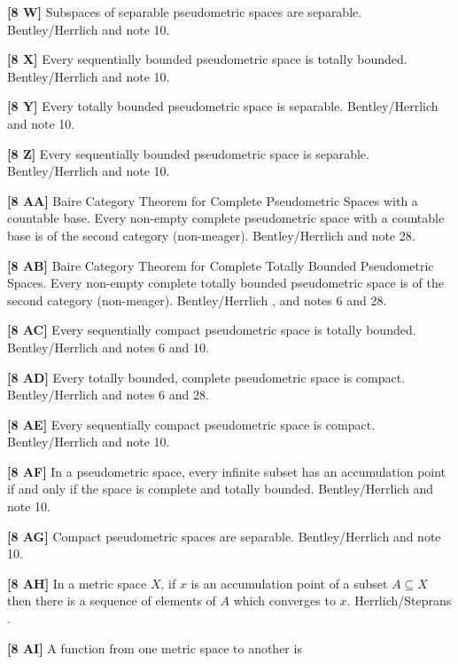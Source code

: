 \smallskip
\item{}{\bf [8 W]} Subspaces of separable pseudometric spaces are separable.
\ac{Bentley/Herrlich} \cite{1998} and note 10.
\smallskip
\item{}{\bf [8 X]} Every sequentially bounded pseudometric space is
totally bounded. \ac{Bentley/Herrlich} \cite{1998} and note 10.
\smallskip
\item{}{\bf [8 Y]} Every totally bounded pseudometric space is
separable.  \ac{Bentley/Herrlich} \cite{1998} and note 10.
\smallskip
\item{}{\bf [8 Z]} Every sequentially bounded pseudometric space is
separable.  \ac{Bentley/Herrlich} \cite{1998} and note 10.
\smallskip
\item{}{\bf [8 AA]} Baire Category Theorem for Complete Pseudometric
Spaces with a countable base.  Every non-empty complete pseudometric
space with a countable base is of the second category (non-meager).
\ac{Bentley/Herrlich} \cite{1998} and note 28.
\smallskip
\item{}{\bf [8 AB]} Baire Category Theorem for Complete Totally
Bounded Pseudometric Spaces.  Every non-empty complete totally bounded
pseudometric space is of the second category (non-meager).
\ac{Bentley/Herrlich} \cite{1998}, and notes 6 and 28.
\smallskip
\item{}{\bf [8 AC]} Every sequentially compact pseudometric space is
totally bounded. \ac{Bentley/Herrlich} \cite{1998} and notes 6 and 10.
\smallskip
\item{}{\bf [8 AD]} Every totally bounded, complete pseudometric space
is compact.  \ac{Bentley/Herrlich} \cite{1998} and notes 6 and 28.
\smallskip
\item{}{\bf [8 AE]} Every sequentially compact pseudometric space is
compact.  \ac{Bentley/Herrlich} \cite{1998} and note 10.
\smallskip
\item{}{\bf [8 AF]} In a pseudometric space, every infinite subset has
an accumulation point if and only if the space is complete and totally
bounded.  \ac{Bentley/Herrlich} \cite{1998} and note 10.
\smallskip
\item{}{\bf [8 AG]} Compact pseudometric spaces are separable.
\ac{Bentley/Herrlich} \cite{1998} and note 10.
\smallskip
\item{}{\bf [8 AH]} In a metric space $X$, if $x$ is an accumulation
point of a subset $A\subseteq X$ then there is a sequence of elements
of $A$ which converges to $x$. \ac{Herrlich/Steprans} \cite{1997}.
\smallskip
\item{}{\bf [8 AI]} A function from one metric space to another is
